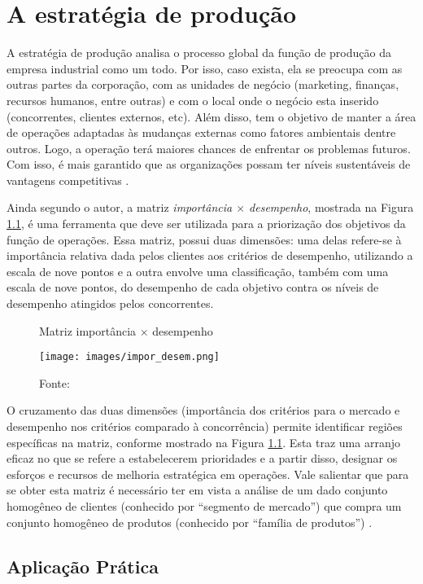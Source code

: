 \chapter{A estratégia de produção}
\label{chap:estrategia_da_producao}

A estratégia de produção analisa o processo global da função de produção da empresa industrial como um todo. Por isso, caso exista, ela se preocupa com as outras partes da corporação, com as unidades de negócio (marketing, finanças, recursos humanos, entre outras) e com o local onde o negócio esta inserido (concorrentes, clientes externos, etc). Além disso, tem o objetivo de manter a área de operações adaptadas às mudanças externas como fatores ambientais dentre outros. Logo, a operação terá maiores chances de enfrentar os problemas futuros. Com isso, é mais garantido que as organizações possam ter níveis sustentáveis de vantagens competitivas \cite{correa2000administracao}.

Ainda segundo o autor, a matriz \textit{importância $\times$ desempenho}, mostrada na Figura \ref{fig:matriz_importancia_desempenho}, é uma ferramenta que deve ser utilizada para a priorização dos objetivos da função de operações. Essa matriz, possui duas dimensões: uma delas refere-se à importância relativa dada pelos clientes aos critérios de desempenho, utilizando a escala de nove pontos e a outra envolve uma classificação, também com uma escala de nove pontos, do desempenho de cada objetivo contra os níveis de desempenho atingidos pelos concorrentes.

\begin{figure}[H]
  \caption{Matriz importância $\times$ desempenho}
  \texttt{[image: images/impor\_desem.png]}
  \label{fig:matriz_importancia_desempenho}
  \caption*{Fonte: \cite{correa2000administracao}}
\end{figure}

O cruzamento das duas dimensões (importância dos critérios para o mercado e desempenho nos critérios comparado à concorrência) permite identificar regiões específicas na matriz, conforme mostrado na Figura \ref{fig:matriz_importancia_desempenho}. Esta traz uma arranjo eficaz no que se refere a estabelecerem prioridades e a partir disso, designar os esforços e recursos de melhoria estratégica em operações. Vale salientar que para se obter esta matriz é necessário ter em vista a análise de um dado conjunto homogêneo de clientes (conhecido por ``segmento de mercado'') que compra um conjunto homogêneo de produtos (conhecido por ``família de produtos'') \cite{correa2000administracao}.



\section{Aplicação Prática}
\label{sec:estrategia_da_producao_aplicacao}
